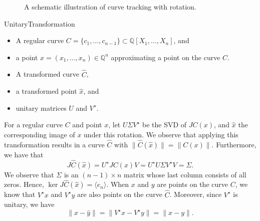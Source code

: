 \begin{figure}
    \centering
    
    \caption{A schematic illustration of curve tracking with rotation.}
    \label{fig:curve_rotation}
\end{figure}


\algrenewcommand{}
\algrenewcommand{}

\begin{algorithm}[ht]
	\caption{UnitaryTransformation}
 \label{algo:transform}
\begin{algorithmic}[1]
\Require  
\begin{itemize}
    \item A regular curve $C=\{c_1,\dots, c_{n-1}\}\subset\mathbb{Q}[X_1,\dots, X_n]$, and
    \item a point $x=(x_1,\dots,x_n)\in \mathbb{Q}^n$ approximating a point on the curve $C$.
\end{itemize}
\Ensure \begin{itemize}

    \item A transformed curve $\hat{C}$,
    \item a transformed point $\hat{x}$, and
    \item unitary matrices $U$ and $V^\star$.
\end{itemize} 

 \end{algorithmic}
 \end{algorithm}

For a regular curve $C$ and point $x$, let $U\Sigma V^\star$ be the SVD of $JC(x)$, and $\hat{x}$ the corresponding image of $x$ under this rotation.  We observe that applying this transformation results in a curve $\hat{C}$ with $\|\hat{C}(\hat{x})\|=\|C(x)\|$. Furthermore, we have that
    $$
    J\hat{C}(\hat{x})= U^\star JC(x)V=U^\star U\Sigma V^\star V=\Sigma.
    $$
We observe that $\Sigma$ is an $(n-1)\times n$ matrix whose last column consists of all zeros. Hence, $\ker J\hat{C}(\hat{x})=\langle e_n\rangle$. When $x$ and $y$ are points on the curve $C$, we know that $V^\star x$ and $V^\star y$ are also points on the curve $\hat{C}$. Moreover, since $V^\star$ is unitary, we have
\[\|\hat{x}-\hat{y}\|=\|V^\star x-V^\star y\|=\|x-y\|.\]

